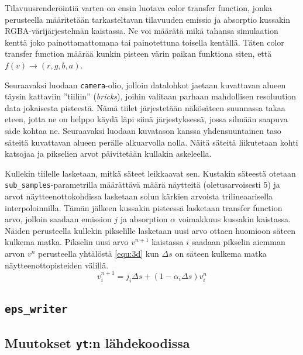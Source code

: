 \documentclass[12pt,a4paper]{article}
\newcommand{\yt}{\texttt{yt}}
\begin{document}
Tilavuusrenderöintiä varten on ensin luotava color transfer function, %
jonka perusteella määritetään tarkasteltavan tilavuuden emissio ja absorptio kussakin RGBA-väri\-järjes\-telmän kaistassa. Ne voi määrätä mikä tahansa simulaation kenttä joko painottamattomana tai painotettuna toisella kentällä. Täten color transfer function määrää kunkin pisteen värin paikan funktiona siten, että $f(v) \rightarrow (r, g, b, a)$. \cite{volume}

Seuraavaksi luodaan \texttt{camera}-olio, jolloin datalohkot jaetaan kuvattavan alueen täysin kattaviin ''tiiliin'' (\textit{bricks}), joihin valitaan parhaan mahdollisen resoluution data jokaisesta pisteestä. Nämä tiilet järjestetään näkösäteen suunnassa takaa eteen, jotta ne on helppo käydä läpi siinä järjestyksessä, jossa silmään saapuva säde kohtaa ne. Seuraavaksi luodaan kuvatason kanssa yhdensuuntainen taso säteitä kuvattavan alueen perälle alkuarvolla nolla. Näitä säteitä liikutetaan kohti katsojaa ja pikselien arvot päivitetään kullakin askeleella. \cite{volume}

\begin{sloppypar}
Kullekin tiilelle lasketaan, mitkä säteet leikkaavat sen. Kustakin säteestä otetaan \texttt{sub\_samples}-parametrilla määrättävä määrä näytteitä (oletusarvoisesti 5) ja arvot näytteenottokohdissa lasketaan solun kärkien arvoista trilineaarisella interpoloinnilla. Tämän jälkeen kussakin pisteessä lasketaan transfer function arvo, jolloin saadaan emission $j$ ja absorption $\alpha$ voimakkuus kussakin kaistassa. Näiden perusteella kullekin pikselille lasketaan uusi arvo ottaen huomioon säteen kulkema matka. Pikselin uusi arvo $v^{n+1}$ kaistassa $i$ saadaan pikselin aiemman arvon $v^n$ perusteella yhtälöstä \ref{equ:3d} kun $\Delta s$ on säteen kulkema matka näytteenottopisteiden välillä.
\begin{equation}\label{equ:3d}
v^{n+1}_{i} =  j_{i}\Delta s + (1 - \alpha_{i}\Delta s )v^{n}_{i}
\end{equation}
\end{sloppypar}

\subsection{\texttt{eps\_writer}}

\subsection{Muutokset \yt :n lähdekoodissa} %
\end{document}
